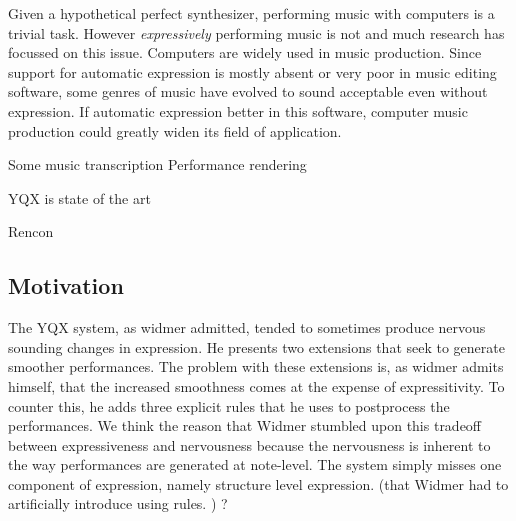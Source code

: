 \documentclass[a4paper,10pt]{article}
\begin{document}
Given a hypothetical perfect synthesizer, performing music with computers is a trivial task. However \textit{expressively} performing music is not and much research has focussed on this issue. Computers are widely used in music production. Since support for automatic expression is mostly absent or very poor in music editing software, some genres of music have evolved to sound acceptable even without expression. If automatic expression better in this software, computer music production could greatly widen its field of application.

Some music transcription
Performance rendering

YQX is state of the art

Rencon




\subsection{Motivation}

The YQX system, as widmer admitted, tended to sometimes produce nervous sounding changes in expression. He presents two extensions that seek to generate smoother performances. The problem with these extensions is, as widmer admits himself, that the increased smoothness comes at the expense of expressitivity. To counter this, he adds three explicit rules that he uses to postprocess the performances. We think the reason that Widmer stumbled upon this tradeoff between expressiveness and nervousness because the nervousness is inherent to the way performances are generated at note-level. The system simply misses one component of expression, namely structure level expression. (that Widmer had to artificially introduce using rules. ) ?
\end{document}
